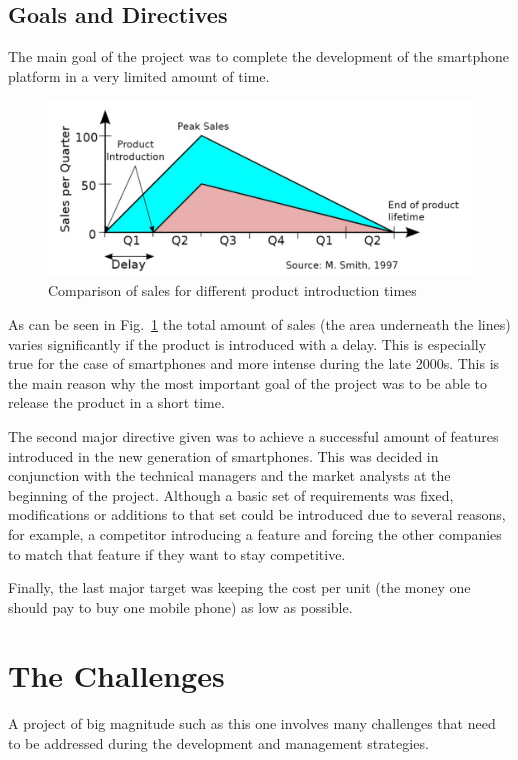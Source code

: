 \documentclass[conference]{IEEEtran}
\begin{document}
\subsection{Goals and Directives}
The main goal of the project was to complete the development of the smartphone platform in a very limited amount of time. 

\begin{figure}[h]
    \centering
    \includegraphics[width=\linewidth]{sales.jpg}
    \caption{Comparison of sales for different product introduction times}
    \label{fig:sales}
\end{figure}

As can be seen in Fig.~\ref{fig:sales} the total amount of sales (the area underneath the lines) varies significantly if the product is introduced with a delay. This is especially true for the case of smartphones and more intense during the late 2000s. This is the main reason why the most important goal of the project was to be able to release the product in a short time.

The second major directive given was to achieve a successful amount of features introduced in the new generation of smartphones. This was decided in conjunction with the technical managers and the market analysts at the beginning of the project. Although a basic set of requirements was fixed, modifications or additions to that set could be introduced due to several reasons, for example, a competitor introducing a feature and forcing the other companies to match that feature if they want to stay competitive.

Finally, the last major target was keeping the cost per unit (the money one should pay to buy one mobile phone) as low as possible. 

\section{The Challenges}
A project of big magnitude such as this one involves many challenges that need to be addressed during the development and management strategies.
\end{document}
